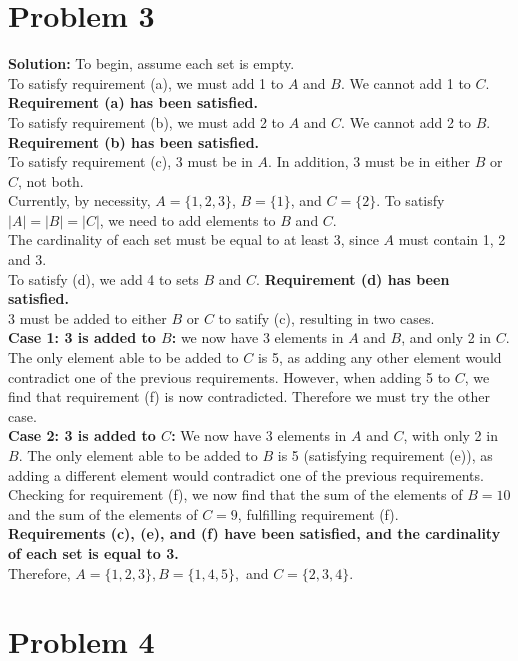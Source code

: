 \documentclass[11pt]{article}
\begin{document}
\newpage


\section*{Problem 3}


\textbf{Solution:} To begin, assume each set is empty.\\
To satisfy requirement (a), we must add 1 to $A$ and $B$. We cannot add 1 to $C$. \textbf{Requirement (a) has been satisfied.}\\
To satisfy requirement (b), we must add 2 to $A$ and $C$. We cannot add 2 to $B$. \textbf{Requirement (b) has been satisfied.}\\
To satisfy requirement (c), 3 must be in $A$. In addition, 3 must be in either $B$ or $C$, not both.\\
Currently, by necessity, $A = \{1, 2, 3\}$, $B = \{1\}$, and $C = \{2\}$. To satisfy $|A| = |B| = |C|$, we need to add elements to $B$ and $C$.\\
The cardinality of each set must be equal to at least 3, since $A$ must contain 1, 2 and 3.\\
To satisfy (d), we add 4 to sets $B$ and $C$. \textbf{Requirement (d) has been satisfied.}\\
3 must be added to either $B$ or $C$ to satify (c), resulting in two cases.\\
\textbf{Case 1: 3 is added to $B$:} we now have 3 elements in $A$ and $B$, and only 2 in $C$. The only element able to be added to $C$ is 5, as adding any other element would contradict one of the previous requirements. However, when adding 5 to $C$, we find that requirement (f) is now contradicted. Therefore we must try the other case.\\
\textbf{Case 2: 3 is added to $C$:} We now have 3 elements in $A$ and $C$, with only 2 in $B$. The only element able to be added to $B$ is 5 (satisfying requirement (e)), as adding a different element would contradict one of the previous requirements. Checking for requirement (f), we now find that the sum of the elements of $B = 10$ and the sum of the elements of $C =9$, fulfilling requirement (f).\\
\textbf{Requirements (c), (e), and (f) have been satisfied, and the cardinality of each set is equal to 3.}\\
Therefore, $A = \{1, 2, 3\}, B = \{1, 4, 5\},$ and $C = \{2, 3, 4\}$.


\newpage


\section*{Problem 4}
\end{document}
